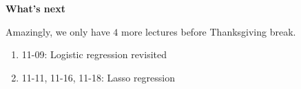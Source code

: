 \begin{frame}[fragile] \frametitle{}

\textbf{What's next}

Amazingly, we only have $4$ more lectures before Thanksgiving break.

\begin{enumerate}
\item 11-09: Logistic regression revisited
\item 11-11, 11-16, 11-18: Lasso regression
\end{enumerate}

\end{frame}















